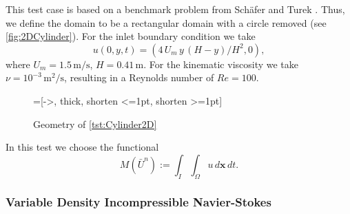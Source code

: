 \begin{test} \label{tst:Cylinder2D}

  This test case is based on a benchmark problem from Sch\"afer and Turek
  \cite[Test case 2D-2]{Schaefer1996}. Thus, we define the domain to be a
  rectangular domain with a circle removed (see \autoref{fig:2DCylinder}). For
  the inlet boundary condition we take
  \begin{equation}
    u(0,y,t) = (4\, U_m\,y\, (H - y)/H^2, 0),
    \label{eqn:2DInlet}
  \end{equation}
  where $U_m = 1.5\, \text{m/s}$, $H = 0.41\, \text{m}$. For the kinematic
  viscosity we take $\nu = 10^{-3}\, \text{m}^2\text{/s}$, resulting in a
  Reynolds number of $Re=100$.

  \begin{figure}[h]
    \centering
    =[->, thick, shorten <=1pt, shorten >=1pt]
    \caption{Geometry of \autoref{tst:Cylinder2D}}
    \label{fig:2DCylinder}
  \end{figure}

  In this test we choose the functional
  \begin{equation}
      M(\bar{U}^n) := \int_I\! \int_{\Omega}\! u\, d\mathbf{x}\, dt.
      \label{eq:NSEFunctional}
  \end{equation}

\end{test}

\subsubsection{Variable Density Incompressible Navier-Stokes}

